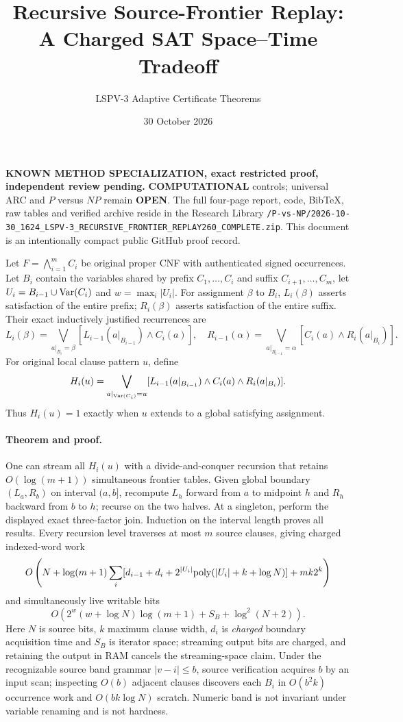 \documentclass[11pt]{article}
\title{Recursive Source-Frontier Replay: A Charged SAT Space--Time Tradeoff}
\author{LSPV-3 Adaptive Certificate Theorems}
\date{30 October 2026}
\begin{document}
\maketitle
\noindent\textbf{KNOWN METHOD SPECIALIZATION, exact restricted proof, independent review pending.}
\textbf{COMPUTATIONAL} controls; universal ARC and $P$ versus $NP$ remain \textbf{OPEN}.
The full four-page report, code, BibTeX, raw tables and verified archive reside in the Research Library
\texttt{/P-vs-NP/2026-10-30\_1624\_LSPV-3\_RECURSIVE\_FRONTIER\_REPLAY260\_COMPLETE.zip}.
This document is an intentionally compact public GitHub proof record.

Let $F=\bigwedge_{i=1}^m C_i$ be original proper CNF with authenticated signed occurrences. Let
$B_i$ contain the variables shared by prefix $C_1,\ldots,C_i$ and suffix
$C_{i+1},\ldots,C_m$, let $U_i=B_{i-1}\cup{\rm Var}(C_i)$ and $w=\max_i|U_i|$.
For assignment $\beta$ to $B_i$, $L_i(\beta)$ asserts satisfaction of the entire
prefix; $R_i(\beta)$ asserts satisfaction of the entire suffix. Their exact
inductively justified recurrences are
\[
L_i(\beta)=\bigvee_{a|_{B_i}=\beta}
 [L_{i-1}(a|_{B_{i-1}})\land C_i(a)],\quad
R_{i-1}(\alpha)=\bigvee_{a|_{B_{i-1}}=\alpha}
 [C_i(a)\land R_i(a|_{B_i})].
\]
For original local clause pattern $u$, define
\[
H_i(u)=\bigvee_{a|_{{\rm Var}(C_i)}=u}
 [L_{i-1}(a|_{B_{i-1}})\land C_i(a)\land R_i(a|_{B_i})].
\]
Thus $H_i(u)=1$ exactly when $u$ extends to a global satisfying assignment.
\paragraph{Theorem and proof.}
One can stream all $H_i(u)$ with a divide-and-conquer recursion that retains
$O(\log(m+1))$ simultaneous frontier tables. Given global boundary
$(L_a,R_b)$ on interval $(a,b]$, recompute $L_h$ forward from $a$ to midpoint
$h$ and $R_h$ backward from $b$ to $h$; recurse on the two halves.
At a singleton, perform the displayed exact three-factor join.
Induction on the interval length proves all results. Every recursion level
traverses at most $m$ source clauses, giving charged indexed-word work
\[
O\left(N+\log(m+1)\sum_i
 [d_{i-1}+d_i+2^{|U_i|}{\rm poly}(|U_i|+k+\log N)]
 +mk2^k\right)
\]
and simultaneously live writable bits
\[
O(2^w(w+\log N)\log(m+1)+S_B+\log^2(N+2)).
\]
Here $N$ is source bits, $k$ maximum clause width, $d_i$ is \emph{charged}
boundary acquisition time and $S_B$ is iterator space; streaming output bits
are charged, and retaining the output in RAM cancels the streaming-space claim.
Under the recognizable source band grammar $|v-i|\le b$, source verification
acquires $b$ by an input scan; inspecting $O(b)$ adjacent clauses discovers
each $B_i$ in $O(b^2k)$ occurrence work and $O(bk\log N)$ scratch.
Numeric band is not invariant under variable renaming and is not hardness.
\end{document}
